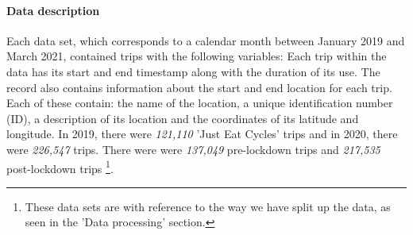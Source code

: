 \documentclass[11pt,a4paper]{article}
\begin{document}
\paragraph{Data description}
Each data set, which corresponds to a calendar month between January 2019 and March 2021, contained trips with the following variables: \newline Each trip within the data has its start and end timestamp along with the duration of its use. The record also contains information about the start and end location for each trip. Each of these contain: the name of the location, a unique identification number (ID), a description of its location and the coordinates of its latitude and longitude. In 2019, there were \emph{121,110} 'Just Eat Cycles' trips and in 2020, there were \emph{226,547} trips. There were were \emph{137,049} pre-lockdown trips and \emph{217,535} post-lockdown trips \footnote{These data sets are with reference to the way we have split up the data, as seen in the 'Data processing' section.}.
\end{document}
